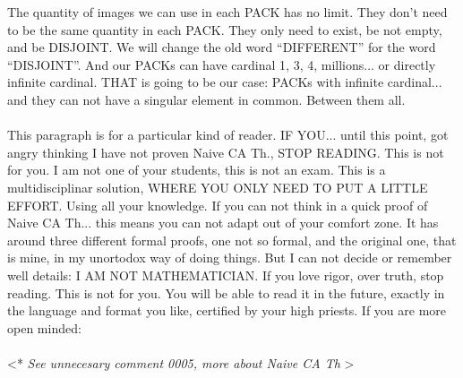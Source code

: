 	\noindent
	The quantity of images we can use in each PACK has no limit. They don't need to be the same quantity in each PACK. They only need to exist, be not empty, and be DISJOINT. We will change the old word ``DIFFERENT'' for the word ``DISJOINT''. And our PACKs can have cardinal 1, 3, 4, millions... or directly infinite cardinal. THAT is going to be our case: PACKs with infinite cardinal... and they can not have a singular element in common. Between them all.
	\\\\
	
	
	
	\noindent
	This paragraph is for a particular kind of reader. IF YOU... until this point, got angry thinking I have not proven Naive CA Th., STOP READING. This is not for you. I am not one of your students, this is not an exam. This is a multidisciplinar solution, WHERE YOU ONLY NEED TO PUT A LITTLE EFFORT. Using all your knowledge. If you can not think in a quick proof of Naive CA Th... this means you can not adapt out of your comfort zone. It has around three different formal proofs, one not so formal, and the original one, that is mine, in my unortodox way of doing things. But I can not decide or remember well details: I AM NOT MATHEMATICIAN. If you love rigor, over truth, stop reading. This is not for you. You will be able to read it in the future, exactly in the language and format you like, certified by your high priests. If you are more open minded:\\\\
	
	\noindent
	\textless ** \textit{See unnecesary comment 0005, more about Naive CA Th} \textgreater
	\\\\

\newpage